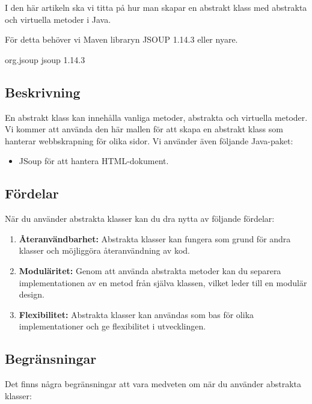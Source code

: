 I den här artikeln ska vi titta på hur man skapar en abstrakt klass med
abstrakta och virtuella metoder i Java.

För detta behöver vi Maven libraryn JSOUP 1.14.3 eller nyare.

org.jsoup jsoup 1.14.3

\hypertarget{beskrivning}{%
\subsection{Beskrivning}\label{beskrivning}}

En abstrakt klass kan innehålla vanliga metoder, abstrakta och virtuella
metoder. Vi kommer att använda den här mallen för att skapa en abstrakt
klass som hanterar webbskrapning för olika sidor. Vi använder även
följande Java-paket:

\begin{itemize}
\tightlist
\item
  JSoup för att hantera HTML-dokument.
\end{itemize}

\hypertarget{fuxf6rdelar}{%
\subsection{Fördelar}\label{fuxf6rdelar}}

När du använder abstrakta klasser kan du dra nytta av följande fördelar:

\begin{enumerate}
\def\labelenumi{\arabic{enumi}.}
\tightlist
\item
  \textbf{Återanvändbarhet:} Abstrakta klasser kan fungera som grund för
  andra klasser och möjliggöra återanvändning av kod.
\item
  \textbf{Moduläritet:} Genom att använda abstrakta metoder kan du
  separera implementationen av en metod från själva klassen, vilket
  leder till en modulär design.
\item
  \textbf{Flexibilitet:} Abstrakta klasser kan användas som bas för
  olika implementationer och ge flexibilitet i utvecklingen.
\end{enumerate}

\hypertarget{begruxe4nsningar}{%
\subsection{Begränsningar}\label{begruxe4nsningar}}

Det finns några begränsningar att vara medveten om när du använder
abstrakta klasser:


